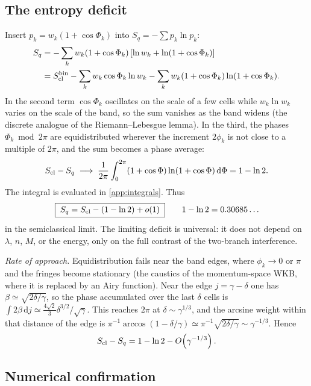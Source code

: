 \documentclass[preprint,12pt]{elsarticle}
\newcommand{\dd}{\mathrm{d}}
\newcommand{\Scl}{S_{\rm cl}}
\begin{document}
\subsection{The entropy deficit}

Insert $p_{k}=w_{k}(1+\cos\Phi_{k})$ into $S_{q}=-\sum p_{k}\ln p_{k}$:
\begin{align}
S_{q}&=-\sum_{k}w_{k}(1+\cos\Phi_{k})\left[\ln w_{k}+\ln(1+\cos\Phi_{k})\right]
\nonumber\\
&=\Scl^{\rm bin}-\sum_{k}w_{k}\cos\Phi_{k}\ln w_{k}
-\sum_{k}w_{k}(1+\cos\Phi_{k})\ln(1+\cos\Phi_{k}).
\end{align}
In the second term $\cos\Phi_{k}$ oscillates on the scale of a few cells while
$w_{k}\ln w_{k}$ varies on the scale of the band, so the sum vanishes as the
band widens (the discrete analogue of the Riemann--Lebesgue lemma). In the
third, the phases $\Phi_{k}\bmod2\pi$ are equidistributed wherever the
increment $2\phi_{k}$ is not close to a multiple of $2\pi$, and the sum becomes
a phase average:
\begin{equation}
\Scl-S_{q}\;\longrightarrow\;\frac{1}{2\pi}\int_{0}^{2\pi}
(1+\cos\Phi)\ln(1+\cos\Phi)\,\dd\Phi=1-\ln2 .
\label{eq:deficit}
\end{equation}
The integral is evaluated in \ref{app:integrals}. Thus
\begin{equation}
\boxed{\;S_{q}=\Scl-\left(1-\ln2\right)+o(1)\;}\qquad
1-\ln2=0.30685\ldots
\label{eq:main}
\end{equation}
in the semiclassical limit. The limiting deficit is universal: it does not
depend on $\lambda$, $n$, $M$, or the energy, only on the full contrast of the
two-branch interference.

\emph{Rate of approach.} Equidistribution fails near the band edges, where
$\phi_{k}\to0$ or $\pi$ and the fringes become stationary (the caustics of the
momentum-space WKB, where it is replaced by an Airy function). Near the edge
$j=\gamma-\delta$ one has $\beta\simeq\sqrt{2\delta/\gamma}$, so the phase
accumulated over the last $\delta$ cells is
$\int2\beta\,\dd j\simeq\tfrac{4\sqrt2}{3}\delta^{3/2}/\sqrt\gamma$. This reaches
$2\pi$ at $\delta\sim\gamma^{1/3}$, and the arcsine weight within that distance
of the edge is $\pi^{-1}\arccos(1-\delta/\gamma)\simeq\pi^{-1}\sqrt{2\delta/\gamma}
\sim\gamma^{-1/3}$. Hence
\begin{equation}
\Scl-S_{q}=1-\ln2-O\!\left(\gamma^{-1/3}\right).
\end{equation}

\subsection{Numerical confirmation}
\end{document}
